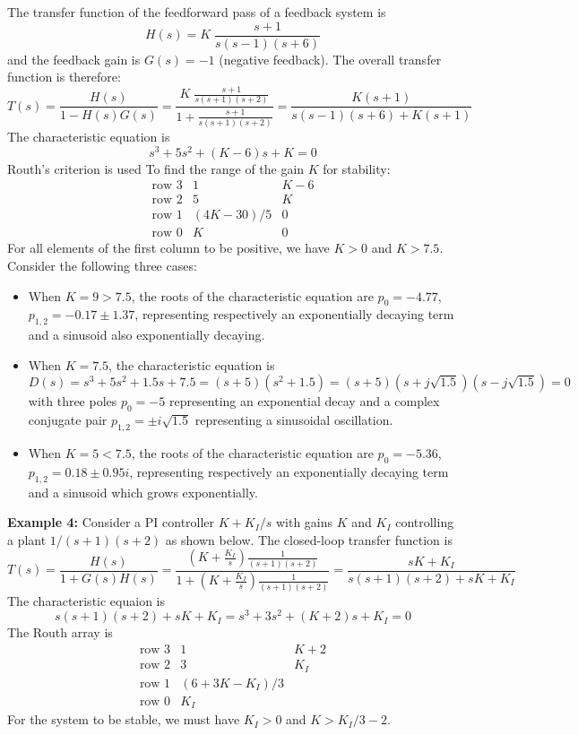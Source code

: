 \documentclass[12pt]{article}
\begin{document}
The transfer function of the feedforward pass of a feedback system is 
\[ H(s)=K\;\frac{s+1}{s(s-1)(s+6)} \]
and the feedback gain is $G(s)=-1$ (negative feedback). The overall transfer 
function is therefore:
\[ T(s)=\frac{H(s)}{1-H(s)G(s)}=\frac{K\;\frac{s+1}{s(s+1)(s+2)}}{1+\frac{s+1}{s(s+1)(s+2)}}
=\frac{K(s+1)}{s(s-1)(s+6)+K(s+1)} \]
The characteristic equation is
\[ s^3+5 s^2+(K-6) s+K=0 \]
Routh's criterion is used To find the range of the gain $K$ for stability:
\[ \begin{array}{rrr}
\mbox{row 3} & 1 & K-6 \\
\mbox{row 2} & 5 & K   \\
\mbox{row 1} & (4K-30)/5 & 0 \\
\mbox{row 0} & K & 0 
\end{array} \]
For all elements of the first column to be positive, we have $K>0$ and $K>7.5$.
Consider the following three cases:
\begin{itemize}
\item When $K=9>7.5$, the roots of the characteristic equation are
$p_0=-4.77$, $p_{1,2}=-0.17\pm 1.37$, representing respectively an exponentially 
decaying term and a sinusoid also exponentially decaying.

\item When $K=7.5$, the characteristic equation is
\[ D(s)=s^3+5s^2+1.5s+7.5=(s+5)(s^2+1.5)=(s+5)(s+j\sqrt{1.5})(s-j\sqrt{1.5})=0 \]
with three poles $p_0=-5$ representing an exponential decay and a complex conjugate
pair $p_{1,2}=\pm i\sqrt{1.5}$ representing a sinusoidal oscillation.

\item When $K=5<7.5$, the roots of the characteristic equation are
$p_0=-5.36$, $p_{1,2}=0.18\pm 0.95 i$, representing respectively an exponentially 
decaying term and a sinusoid which grows exponentially.
\end{itemize}

{\bf Example 4:}
Consider a PI controller $K+K_I/s$ with gains $K$ and $K_I$ controlling a plant
$1/(s+1)(s+2)$ as shown below. The closed-loop transfer function is
\[ T(s)=\frac{H(s)}{1+G(s)H(s)}=\frac{(K+\frac{K_I}{s})\frac{1}{(s+1)(s+2)}}{1+(K+\frac{K_I}{s})\frac{1}{(s+1)(s+2)}}
=\frac{sK+K_I}{s(s+1)(s+2)+sK+K_I}
\]
The characteristic equaion is
\[ s(s+1)(s+2)+sK+K_I=s^3+3s^2+(K+2)s+K_I=0 \]
The Routh array is
\[ \begin{array}{rrr}
\mbox{row 3} & 1 & K+2 \\
\mbox{row 2} & 3 & K_I \\
\mbox{row 1} & (6+3K-K_I)/3 &  \\
\mbox{row 0} & K_I & 
\end{array} \]
For the system to be stable, we must have $K_I>0$ and $K>K_I/3-2$.
\end{document}
